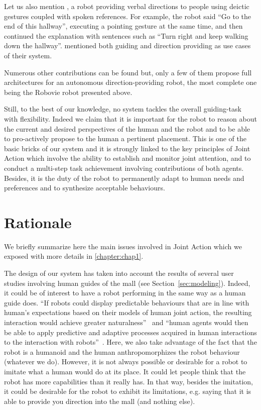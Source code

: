 \documentclass[a4paper,11pt,twoside]{StyleThese}
\begin{document}
Let us also mention \cite{bohus_directions_2014}, a robot providing verbal directions to people using deictic gestures coupled with spoken references. For example, the robot said ``Go to the end of this hallway'', executing a pointing gesture at the same time, and then continued the explanation with sentences such as ``Turn right and keep walking down the hallway''. \cite{tapus_personalized_2015} mentioned both guiding and direction providing as use cases of their system.

Numerous other contributions can be found but,  only a few of them propose full architectures for an autonomous direction-providing robot, the most complete one being the Robovie robot presented above. 

Still, to the best of our knowledge, no system tackles the overall guiding-task with flexibility. Indeed we claim that it is important for the robot
to reason about the current and desired perspectives of the human and the robot and to be able to pro-actively propose to the human a pertinent placement. This is one of the basic bricks of our system and it is strongly linked to the key principles of Joint Action which involve the ability to establish and monitor joint attention,  and to conduct a multi-step task achievement involving contributions of both agents. Besides, it is the duty of the robot to permanently adapt to human needs and preferences and to synthesize acceptable behaviours.

\section{Rationale}\label{sec:rationale}

We briefly summarize here the main issues involved in Joint Action which we exposed with more details in \ref{chapter:chap1}. 

The design of our system has taken into account the results of several user studies involving human guides of the mall (see Section~\ref{sec:modeling}). Indeed, it could be of interest to have a robot performing in the same way as a human guide does.  ``If robots could display predictable behaviours that are in line with human's expectations based on their models of human joint action, the resulting interaction would achieve greater naturalness''~\cite{curioni_2019_joint} and ``human agents would then be able to apply predictive and adaptive processes acquired in human interactions to the interaction with robots''~\cite{curioni_2019_joint}. Here, we also take advantage of the fact that the robot is a humanoid and the human anthropomorphizes the robot behaviour (whatever we do).
However, it is not always possible or desirable for a robot to imitate what a human would do at its place. It could let people think that the robot has more capabilities than it really has. In that way, besides the imitation, it could be desirable for the robot to exhibit its limitations, e.g. saying that it is able to provide you direction into the mall (and nothing else).
\end{document}

